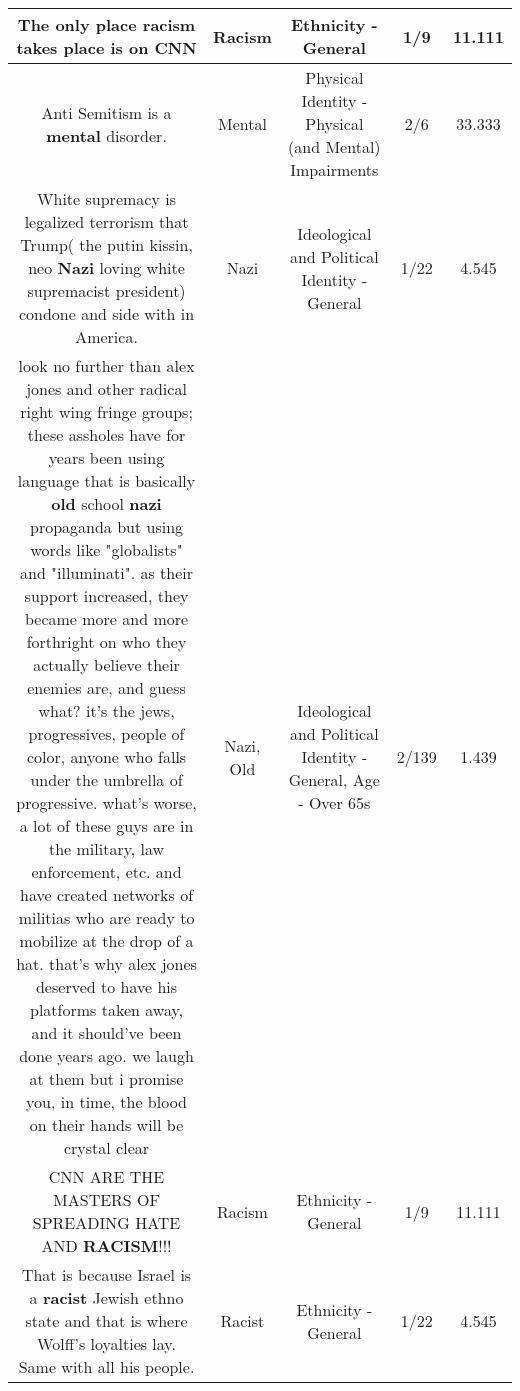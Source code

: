 \documentclass[11pt]{article}
\newlength\mylength
\begin{document}
\begin{center}
\begin{longtable}{|C{.65\mylength}|C{.30\mylength}|C{.12\mylength}|C{.12\mylength}|C{.12\mylength}|}
  \small The only place \textbf{racism} takes place is on CNN\normalsize   & Racism & Ethnicity - General & 1/9 & 11.111 \\  \hline
  \small Anti Semitism is a \textbf{mental} disorder.\normalsize   & Mental & Physical Identity - Physical (and Mental) Impairments & 2/6 & 33.333 \\  \hline
  \small White supremacy is legalized terrorism that Trump( the putin kissin, neo \textbf{Nazi} loving white supremacist president) condone and side with in America.\normalsize   & Nazi &  Ideological and Political Identity - General & 1/22 & 4.545 \\  \hline
  \small look no further than alex jones and other radical right wing fringe groups; these assholes have for years been using language that is basically \textbf{old} school \textbf{nazi} propaganda but using words like "globalists" and "illuminati". as their support increased, they became more and more forthright on who they actually believe their enemies are, and guess what? it's the jews, progressives, people of color, anyone who falls under the umbrella of progressive. what's worse, a lot of these guys are in the military, law enforcement, etc. and have created networks of militias who are ready to mobilize at the drop of a hat. that's why alex jones deserved to have his platforms taken away, and it should've been done years ago. we laugh at them but i promise you, in time, the blood on their hands will be crystal clear\normalsize   & Nazi, Old &  Ideological and Political Identity - General, Age - Over 65s & 2/139 & 1.439 \\  \hline
  \small CNN ARE THE MASTERS OF SPREADING HATE AND \textbf{RACISM}!!!\normalsize   & Racism & Ethnicity - General & 1/9 & 11.111 \\  \hline
  \small That is because Israel is a \textbf{racist} Jewish ethno state and that is where Wolff's loyalties lay. Same with all his people.\normalsize   & Racist & Ethnicity - General & 1/22 & 4.545 \\  \hline

\end{longtable}
\end{center}
\end{document}
